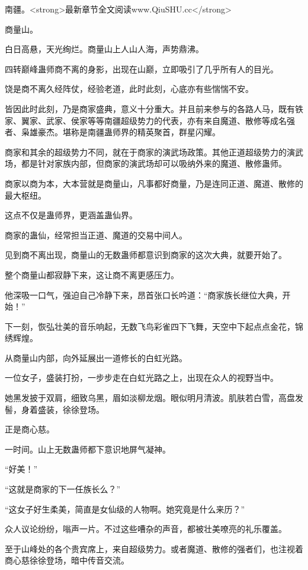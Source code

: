
\begin{this_body}

南疆。<strong>最新章节全文阅读www.QiuSHU.cc</strong>

商量山。

白日高悬，天光绚烂。商量山上人山人海，声势鼎沸。

四转巅峰蛊师商不离的身影，出现在山巅，立即吸引了几乎所有人的目光。

饶是商不离久经阵仗，经验老道，此时此刻，心底亦有些惴惴不安。

皆因此时此刻，乃是商家盛典，意义十分重大。并且前来参与的各路人马，既有铁家、翼家、武家、侯家等等南疆超级势力的代表，亦有来自魔道、散修等成名强者、枭雄豪杰。堪称是南疆蛊师界的精英聚首，群星闪耀。

商家和其余的超级势力不同，就在于商家的演武场政策。其他正道超级势力的演武场，都是针对家族内部，但商家的演武场却可以吸纳外来的魔道、散修蛊师。

商家以商为本，大本营就是商量山，凡事都好商量，乃是连同正道、魔道、散修的最大枢纽。

这点不仅是蛊师界，更涵盖蛊仙界。

商家的蛊仙，经常担当正道、魔道的交易中间人。

见到商不离出现，商量山的无数蛊师都意识到商家的这次大典，就要开始了。

整个商量山都寂静下来，这让商不离更感压力。

他深吸一口气，强迫自己冷静下来，昂首张口长吟道：“商家族长继位大典，开始！”

下一刻，恢弘壮美的音乐响起，无数飞鸟彩雀四下飞舞，天空中下起点点金花，锦绣辉煌。

从商量山内部，向外延展出一道修长的白虹光路。

一位女子，盛装打扮，一步步走在白虹光路之上，出现在众人的视野当中。

她黑发披于双肩，细致乌黑，眉如淡柳龙烟。眼似明月清波。肌肤若白雪，高盘发髻，身着盛装，徐徐登场。

正是商心慈。

一时间。山上无数蛊师都下意识地屏气凝神。

“好美！”

“这就是商家的下一任族长么？”

“这女子好生柔美，简直是女仙级的人物啊。她究竟是什么来历？”

众人议论纷纷，嗡声一片。不过这些嘈杂的声音，都被壮美嘹亮的礼乐覆盖。

至于山峰处的各个贵宾席上，来自超级势力。或者魔道、散修的强者们，也注视着商心慈徐徐登场，暗中传音交流。


\end{this_body}

